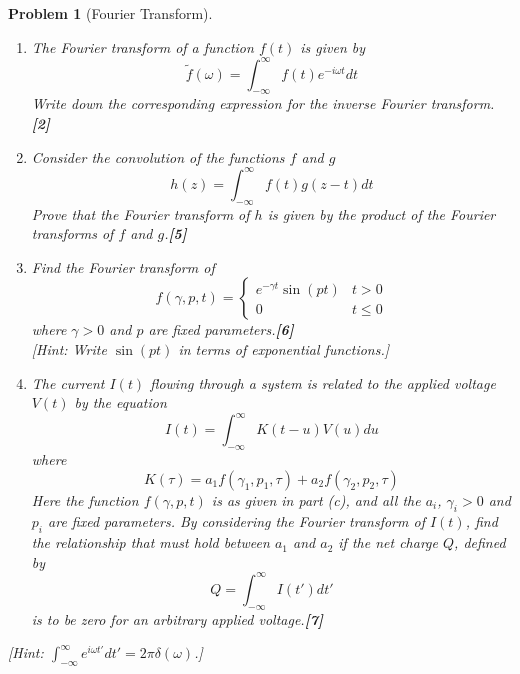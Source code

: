 \documentclass[a4paper]{article}
\theoremstyle{new}
\newtheorem{qns}{Problem}[section]
\begin{document}
\begin{qns}[Fourier Transform]\leavevmode
\begin{enumerate}[label=(\alph*)]
\item The Fourier transform of a function $f(t)$ is given by
$$\tilde{f}(\omega)=\int_{-\infty}^\infty f(t)e^{-i\omega t}dt$$
Write down the corresponding expression for the inverse Fourier transform.\hfill\textbf{[2]}
\item Consider the convolution of the functions $f$ and $g$
$$h(z)=\int_{-\infty}^\infty f(t)g(z-t)dt$$
Prove that the Fourier transform of $h$ is given by the product of the Fourier
transforms of $f$ and $g$.\hfill\textbf{[5]}
\item Find the Fourier transform of
$$f(\gamma,p,t)=
\left\{
        \begin{array}{ll}
      e^{-\gamma t}\sin(pt) & t>0 \\
      0 & t\leq 0
        \end{array}
    \right.$$
    where $\gamma>0$ and $p$ are fixed parameters.\hfill\textbf{[6]}\\[5pt]
    [Hint: Write $\sin(pt)$ in terms of exponential functions.]
\item  The current $I(t)$ flowing through a system is related to the applied voltage $V (t)$ by the equation  
$$I(t)=\int_{-\infty}^\infty K(t-u)V(u)du$$
where
$$K(\tau)=a_1f(\gamma_1,p_1,\tau)+a_2f(\gamma_2,p_2,\tau)$$
Here the function $f(\gamma,p,t)$ is as given in part (c), and all the $a_i$, $\gamma_i>0$ and $p_i$ are fixed parameters. By considering the Fourier transform of $I(t)$, find the relationship that must hold between $a_1$ and $a_2$ if the net charge $Q$, defined by
$$Q=\int_{-\infty}^\infty I(t')dt'$$
is to be zero for an arbitrary applied voltage.\hfill\textbf{[7]}
\end{enumerate}
[Hint: $\int_{-\infty}^\infty e^{i\omega t'}dt'=2\pi\delta(\omega)$.]
\end{qns}
\end{document}
